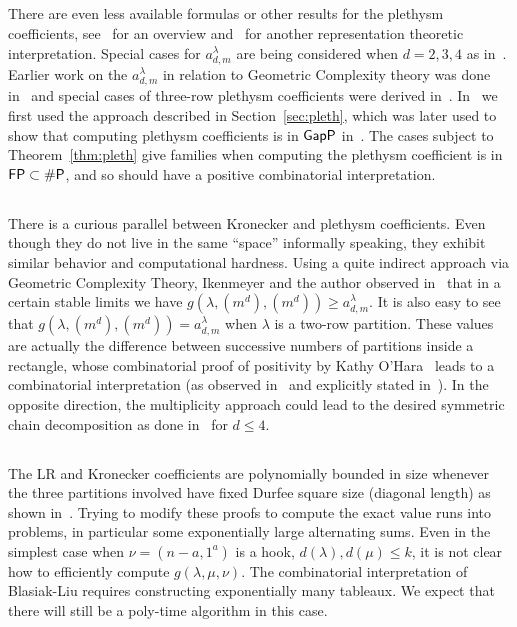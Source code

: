 \documentclass[11pt]{amsart}
\theoremstyle{plain}
\theoremstyle{definition}
\numberwithin{equation}{section}
\newcommand{\la}{\lambda}
\def\FP{{\rm{\textsf{FP}}}}
\def\SP{{{\rm{\textsf{\#P}}}}}
\def\GapP{{{\rm{\textsf{GapP}} }}}
\def\FP{{{}\rm{\textsf{FP}} }}
\def\la{\lambda}
\begin{document}
\subsection{} There are even less available formulas or other results for the plethysm coefficients, see~\cite{colmenarejo2022mystery} for an overview and~\cite{orellana2022plethysm} for another representation theoretic interpretation. Special cases for  $a^\la_{d,m}$ are being considered when $d=2,3,4$ as in~\cite{orellana2024quasi}. Earlier work on the $a^\la_{d,m}$ in relation to Geometric Complexity theory was done in~\cite{IP17} and special cases of three-row plethysm coefficients were derived in~\cite{DIP}. In~\cite{DIP} we first used the approach described in Section~\ref{sec:pleth}, which was later used to show that computing plethysm coefficients is in $\GapP$ in~\cite{FI20}. The cases subject to Theorem~\ref{thm:pleth} give families when computing the plethysm coefficient is in $\FP \subset \SP$, and so should have a positive combinatorial interpretation. 

\subsection{} There is a curious parallel between Kronecker and plethysm coefficients. Even though they do not live in the same ``space'' informally speaking, they exhibit similar behavior and computational hardness. Using a quite indirect approach via Geometric Complexity Theory, Ikenmeyer and the author observed in~\cite{IP17} that in a certain stable limits we have $g(\la, (m^d), (m^d)) \geq a^\la_{d,m}$. It is also easy to see that $g(\la, (m^d),(m^d) ) = a^\la_{d,m}$ when $\la$ is a two-row partition. These values are actually the difference between successive numbers of partitions inside a rectangle, whose combinatorial proof of positivity by Kathy O'Hara~\cite{o1990unimodality} leads to a combinatorial interpretation (as observed in~\cite{PPu} and explicitly stated in~\cite{panova2023computational}). In the opposite direction, the multiplicity approach could lead to the desired symmetric chain decomposition as done in~\cite{orellana2024quasi} for $d\leq 4$. 

\subsection{} The LR and Kronecker coefficients are polynomially bounded in size whenever the three partitions involved have fixed Durfee square size (diagonal length) as shown in~\cite{PP22}. Trying to modify these proofs to compute the exact value runs into problems, in particular some exponentially large alternating sums. Even in the simplest case when $\nu =(n-a,1^a)$ is a hook, $d(\la),d(\mu) \leq k$, it is not clear how to efficiently compute $g(\la,\mu,\nu)$. The combinatorial interpretation of Blasiak-Liu \cite{Bla,BL,Liu} requires constructing exponentially many tableaux. We expect that there will still be a poly-time algorithm in this case.
\end{document}
